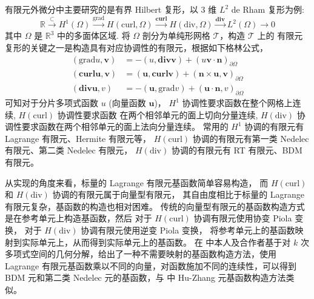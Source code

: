 \documentclass[lang=cn,a4paper,newtx]{elegantpaper}
\begin{document}
有限元外微分中主要研究的是有界 Hilbert 复形，以 3 维 $L^2$ de Rham 复形为例:
$$
\mathbb{R} \xrightarrow{\subset} H^1(\Omega) \xrightarrow{\mathrm{grad}} H(\text{curl}, \Omega)
\xrightarrow{\mathbf{curl}} H(\text{div}, \Omega) \xrightarrow{\mathbf{div}}
L^2(\Omega) \rightarrow 0 
$$ 
其中 $\Omega$ 是 $\mathbb{R}^3$ 中的多面体区域. 将 $\Omega$ 剖分为单纯形网格
$\mathcal{T}$，构造 $\mathcal{T}$ 上的
有限元复形的关键之一是构造具有对应协调性的有限元，根据如下格林公式， 
$$
\begin{aligned}
    (\mathrm{grad} u, \boldsymbol{v}) & = - (u, \mathbf{div} \boldsymbol{v}) +
    (u\boldsymbol{v}\cdot \boldsymbol{n})_{\partial \Omega}\\
    (\mathbf{curl} \boldsymbol{u}, \boldsymbol{v}) & = 
    (\boldsymbol{u}, \mathbf{curl} \boldsymbol{v}) +
    (\boldsymbol{n}\times \boldsymbol{u}, \boldsymbol{v})_{\partial \Omega}\\
    (\mathbf{div} \boldsymbol{u}, v) & = - (\boldsymbol{u}, \mathrm{grad} v) +
    (\boldsymbol{u}\cdot \boldsymbol{n}, v)_{\partial \Omega}
\end{aligned}
$$
可知对于分片多项式函数 $u$ (向量函数 $\boldsymbol{u}$)， $H^1$
协调性要求函数在整个网格上连续, $H(\text{curl})$ 协调性要求函数
在两个相邻单元的面上切向分量连续, $H(\text{div})$
协调性要求函数在两个相邻单元的面上法向分量连续。 常用的 $H^1$
协调的有限元有 Lagrange 有限元、Hermite 有限元等， $H(\text{curl})$
协调的有限元有第一类 Nedelec 有限元、第二类 Nedelec 有限元，
$H(\text{div})$ 协调的有限元有 RT 有限元、BDM 有限元。

从实现的角度来看，标量的 Lagrange 有限元基函数简单容易构造，
而 $H(\text{curl})$ 和 $H(\text{div})$ 协调的有限元属于向量型有限元，
其自由度相比于标量的 Lagrange 有限元复杂，基函数的构造也相对困难。
传统的向量型有限元的基函数构造方式是在参考单元上构造基函数，然后 对于
$H(\text{curl})$ 协调有限元使用协变 Piola 变换， 对于
$H(\text{div})$ 协调有限元使用逆变 Piola 变换，
将参考单元上的基函数映射到实际单元上，从而得到实际单元上的基函数。
在 \cite{Chen2024GeometricDA} 中本人及合作者基于对 $k$
次多项式空间的几何分解，给出了一种不需要映射的基函数构造方法，使用
Lagrange 有限元基函数乘以不同的向量，对函数施加不同的连续性，可以得到 BDM
元和第二类 Nedelec 元的基函数，与\cite{christiansen2018nodal}
中 Hu-Zhang 元基函数构造方法类似。
\end{document}
